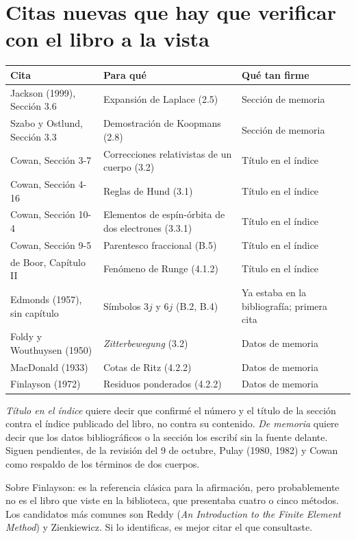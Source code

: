 \documentclass[11pt,a4paper]{article}
\begin{document}
\section{Citas nuevas que hay que verificar con el libro a la vista}

\begin{center}
\begin{tabular}{L{5.6cm}L{5.4cm}L{4.0cm}}
\toprule
\textbf{Cita} & \textbf{Para qué} & \textbf{Qué tan firme}\\
\midrule
Jackson (1999), Sección 3.6 & Expansión de Laplace (2.5) & Sección de memoria\\
Szabo y Ostlund, Sección 3.3 & Demostración de Koopmans (2.8) & Sección de memoria\\
Cowan, Sección 3-7 & Correcciones relativistas de un cuerpo (3.2) & Título en el índice\\
Cowan, Sección 4-16 & Reglas de Hund (3.1) & Título en el índice\\
Cowan, Sección 10-4 & Elementos de espín-órbita de dos electrones (3.3.1) & Título en el índice\\
Cowan, Sección 9-5 & Parentesco fraccional (B.5) & Título en el índice\\
de Boor, Capítulo II & Fenómeno de Runge (4.1.2) & Título en el índice\\
Edmonds (1957), sin capítulo & Símbolos $3j$ y $6j$ (B.2, B.4) & Ya estaba en la bibliografía; primera cita\\
Foldy y Wouthuysen (1950) & \emph{Zitterbewegung} (3.2) & Datos de memoria\\
MacDonald (1933) & Cotas de Ritz (4.2.2) & Datos de memoria\\
Finlayson (1972) & Residuos ponderados (4.2.2) & Datos de memoria\\
\bottomrule
\end{tabular}
\end{center}

\emph{Título en el índice} quiere decir que confirmé el número y el título de la sección contra el
índice publicado del libro, no contra su contenido. \emph{De memoria} quiere decir que los datos
bibliográficos o la sección los escribí sin la fuente delante. Siguen pendientes, de la revisión
del 9 de octubre, Pulay (1980, 1982) y Cowan como respaldo de los términos de dos cuerpos.

Sobre Finlayson: es la referencia clásica para la afirmación, pero probablemente no es el libro
que viste en la biblioteca, que presentaba cuatro o cinco métodos. Los candidatos más comunes son
Reddy (\emph{An Introduction to the Finite Element Method}) y Zienkiewicz. Si lo identificas, es
mejor citar el que consultaste.
\end{document}
